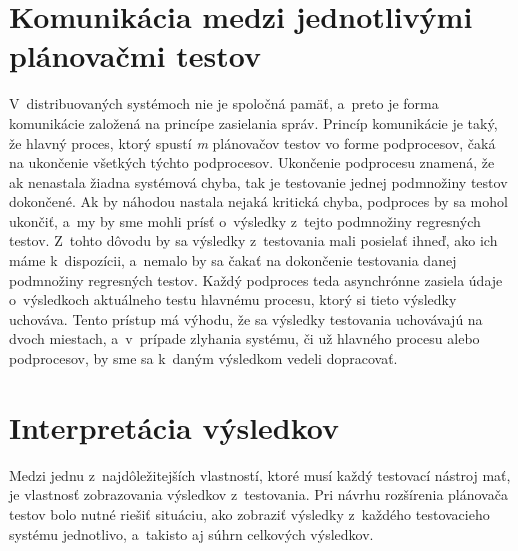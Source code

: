 \section{Komunikácia medzi jednotlivými plánovačmi testov}
\label{sekcia:komunikacia}
V~distribuovaných systémoch nie je spoločná pamäť, a~preto je forma 
komunikácie založená na princípe zasielania správ.
Princíp komunikácie je taký, že hlavný proces, ktorý spustí \emph{m} 
plánovačov testov vo forme podprocesov, čaká na ukončenie
všetkých týchto podprocesov. Ukončenie podprocesu znamená, že ak 
nenastala žiadna systémová chyba, tak je testovanie jednej podmnožiny 
testov dokončené. Ak by náhodou nastala nejaká kritická chyba, 
podproces by sa mohol ukončiť, a~my by sme mohli prísť o~výsledky 
z~tejto podmnožiny regresných testov. Z~tohto dôvodu by sa výsledky 
z~testovania mali posielať ihneď, ako ich máme k~dispozícii,
a~nemalo by sa čakať na dokončenie testovania danej podmnožiny 
regresných testov. Každý podproces teda asynchrónne zasiela údaje 
o~výsledkoch aktuálneho testu hlavnému procesu, ktorý si tieto výsledky 
uchováva. Tento prístup má výhodu, že sa výsledky testovania uchovávajú 
na dvoch miestach, a~v~prípade zlyhania systému, či už hlavného procesu 
alebo podprocesov, by sme sa k~daným výsledkom vedeli dopracovať. 


\section{Interpretácia výsledkov}
\label{sekcia:interpretacia_vysledkov}
Medzi jednu z~najdôležitejších vlastností, ktoré musí každý testovací 
nástroj mať, je vlastnosť zobrazovania výsledkov z~testovania.
Pri návrhu rozšírenia plánovača testov bolo nutné riešiť situáciu, 
ako zobraziť výsledky z~každého testovacieho systému jednotlivo,
a~takisto aj súhrn celkových výsledkov. 


